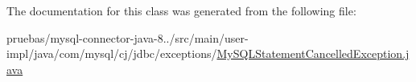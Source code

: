 The documentation for this class was generated from the following file\+:\begin{DoxyCompactItemize}
\item 
pruebas/mysql-\/connector-\/java-\/8../src/main/user-\/impl/java/com/mysql/cj/jdbc/exceptions/\mbox{\hyperlink{_my_s_q_l_statement_cancelled_exception_8java}{My\+S\+Q\+L\+Statement\+Cancelled\+Exception.\+java}}\end{DoxyCompactItemize}
